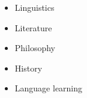 

\begin{cventries}

  \begin{itemize}
    \item Linguistics
    \item Literature
    \item Philosophy
    \item History
    \item Language learning
  \end{itemize}
\end{cventries}
